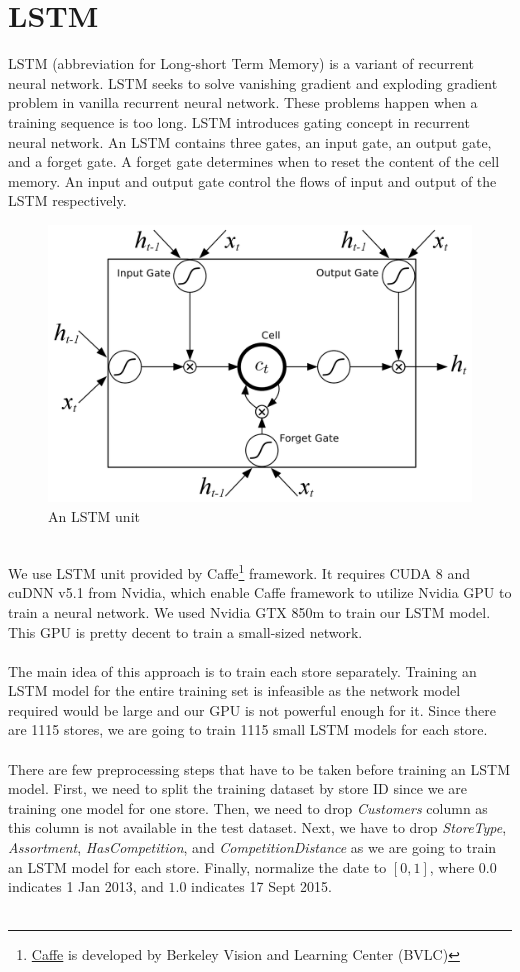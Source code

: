 \section{LSTM}
LSTM (abbreviation for Long-short Term Memory) is a variant of recurrent neural network. LSTM seeks to solve vanishing gradient and exploding gradient problem in vanilla recurrent neural network. These problems happen when a training sequence is too long. LSTM introduces gating concept in recurrent neural network. An LSTM contains three gates, an input gate, an output gate, and a forget gate. A forget gate determines when to reset the content of the cell memory. An input and output gate control the flows of input and output of the LSTM respectively.
\begin{figure}[h]
	\centering
	\includegraphics[width=0.85 \textwidth]{assets/lstm.png}
	\caption{An LSTM unit}
	\label{fig:lstm}
\end{figure} \\
We use LSTM unit provided by Caffe\footnote{\href{https://github.com/BVLC/caffe}{Caffe} is developed by Berkeley Vision and Learning Center (BVLC)} framework. It requires CUDA 8 and cuDNN v5.1 from Nvidia, which enable Caffe framework to utilize Nvidia GPU to train a neural network. We used Nvidia GTX 850m to train our LSTM model. This GPU is pretty decent to train a small-sized network. \\ \\
The main idea of this approach is to train each store separately. Training an LSTM model for the entire training set is infeasible as the network model required would be large and our GPU is not powerful enough for it. Since there are 1115 stores, we are going to train 1115 small LSTM models for each store. \\ \\
There are few preprocessing steps that have to be taken before training an LSTM model. First, we need to split the training dataset by store ID since we are training one model for one store. Then, we need to drop \textit{Customers} column as this column is not available in the test dataset. Next, we have to drop \textit{StoreType}, \textit{Assortment}, \textit{HasCompetition}, and \textit{CompetitionDistance} as we are going to train an LSTM model for each store. Finally, normalize the date to $[0,1]$, where $0.0$ indicates 1 Jan 2013, and $1.0$ indicates 17 Sept 2015. \\ \\
